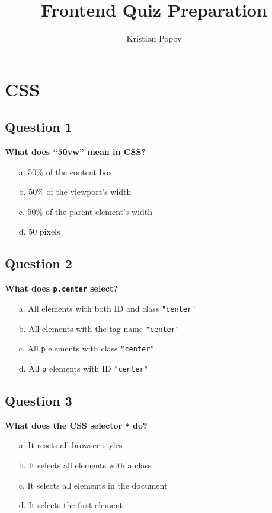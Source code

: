 \documentclass{article}
\title{Frontend Quiz Preparation}
\author{Kristian Popov}
\begin{document}
\maketitle
\tableofcontents
\newpage

\section{CSS}

\subsection*{Question 1}
\textbf{What does ``50vw'' mean in CSS?}

\begin{itemize}
  \item[a.] 50\% of the content box
  \item[b.] 50\% of the viewport’s width
  \item[c.] 50\% of the parent element’s width
  \item[d.] 50 pixels
\end{itemize}

\subsection*{Question 2}
\textbf{What does \texttt{p.center} select?}

\begin{itemize}
  \item[a.] All elements with both ID and class \texttt{"center"}
  \item[b.] All elements with the tag name \texttt{"center"}
  \item[c.] All \texttt{p} elements with class \texttt{"center"}
  \item[d.] All \texttt{p} elements with ID \texttt{"center"}
\end{itemize}

\subsection*{Question 3}
\textbf{What does the CSS selector \texttt{*} do?}

\begin{itemize}
  \item[a.] It resets all browser styles
  \item[b.] It selects all elements with a class
  \item[c.] It selects all elements in the document
  \item[d.] It selects the first element
\end{itemize}
\end{document}
